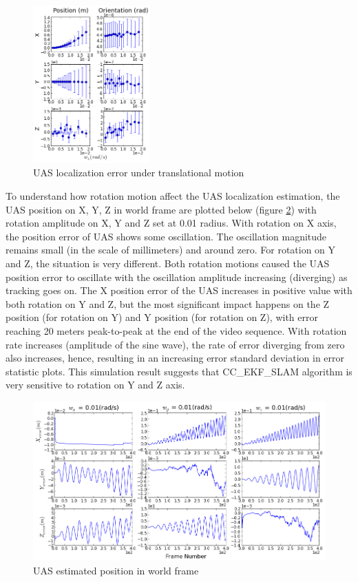 \begin{figure}[h]
  \includegraphics[width=4.5cm, keepaspectratio=true]{./Figures/SimulationFigures/Figure13.png}
  \caption{UAS localization error under translational 
  \label{fig:simfig9-10}
    motion}
\end{figure}

To understand how rotation motion affect the UAS localization
estimation, the UAS position on X, Y, Z in world frame are plotted
below (figure \ref{fig:simfig14}) with rotation amplitude on X, Y and
Z set at 0.01 radius. With rotation on X axis, the position error of
UAS shows some oscillation. The oscillation magnitude remains small
(in the scale of millimeters) and around zero. For rotation on Y and
Z, the situation is very different. Both rotation motions caused the
UAS position error to oscillate with the oscillation amplitude
increasing (diverging) as tracking goes on. The X position error of
the UAS increases in positive value with both rotation on Y and Z, but
the most significant impact happens on the Z position (for rotation on
Y) and Y position (for rotation on Z), with error reaching 20 meters
peak-to-peak at the end of the video sequence. With rotation rate
increases (amplitude of the sine wave), the rate of error diverging
from zero also increases, hence, resulting in an increasing error
standard deviation in error statistic plots. This simulation result
suggests that CC\_EKF\_SLAM algorithm is very sensitive to rotation on
Y and Z axis.

\begin{figure}[h]
  \centering
  \includegraphics[width=13cm, keepaspectratio=true]{./Figures/SimulationFigures/Figure14.png}
  \caption{UAS estimated position in world frame}
  \label{fig:simfig14}
\end{figure}
\FloatBarrier
